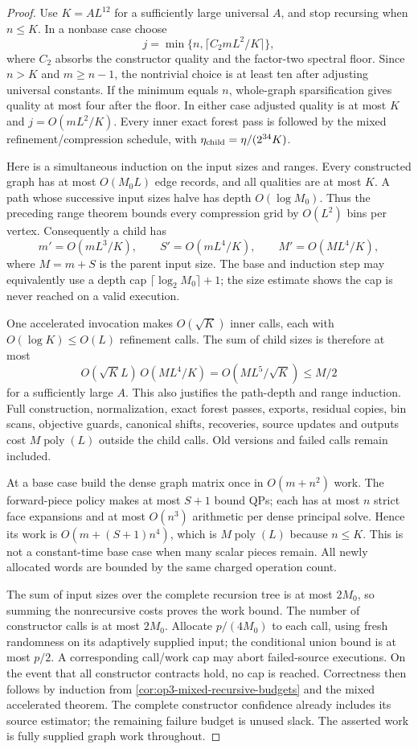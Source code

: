\begin{proof}
Use $K=A L^{12}$ for a sufficiently large universal $A$, and stop
recursing when $n\leq K$. In a nonbase case choose
\[
 j=\min\{n,\lceil C_2mL^2/K\rceil\},
\]
where $C_2$ absorbs the constructor quality and the factor-two spectral
floor. Since $n>K$ and $m\geq n-1$, the nontrivial choice is at least
ten after adjusting universal constants. If the minimum equals $n$,
whole-graph sparsification gives quality at most four after the floor.
In either case adjusted quality is at most $K$ and
$j=O(mL^2/K)$. Every inner exact forest pass is followed by the
mixed refinement/compression schedule, with
$\eta_{\rm child}=\eta/(2^{34}K)$.

Here is a simultaneous induction on the input sizes and ranges.
Every constructed graph has at most $O(M_0L)$ edge records, and
all qualities are at most $K$. A path whose successive input sizes
halve has depth $O(\log M_0)$. Thus the preceding range theorem bounds
every compression grid by $O(L^2)$ bins per vertex. Consequently a child
has
\[
 m' = O(mL^3/K),\qquad S'=O(mL^4/K),\qquad
 M'=O(ML^4/K),
\]
where $M=m+S$ is the parent input size. The base and induction step
may equivalently use a depth cap $\lceil\log_2 M_0\rceil+1$;
the size estimate shows the cap is never reached on a valid execution.

One accelerated invocation makes $O(\sqrt K)$ inner calls, each with
$O(\log K)\leq O(L)$ refinement calls. The sum of child sizes is
therefore at most
\[
 O(\sqrt K L)\,O(ML^4/K)
 =O(ML^5/\sqrt K)\leq M/2
\]
for a sufficiently large $A$. This also justifies the path-depth and
range induction. Full construction, normalization, exact forest passes,
exports, residual copies, bin scans, objective guards, canonical shifts,
recoveries, source updates and outputs cost $M\operatorname{poly}(L)$
outside the child calls. Old versions and failed calls remain included.

At a base case build the dense graph matrix once in $O(m+n^2)$ work.
The forward-piece policy makes at most $S+1$ bound QPs; each has at most
$n$ strict face expansions and at most $O(n^3)$ arithmetic per dense
principal solve. Hence its work is $O(m+(S+1)n^4)$, which is
$M\operatorname{poly}(L)$ because $n\leq K$. This is not a
constant-time base case when many scalar pieces remain. All newly
allocated words are bounded by the same charged operation count.

The sum of input sizes over the complete recursion tree is at most
$2M_0$, so summing the nonrecursive costs proves the work bound.
The number of constructor calls is at most $2M_0$. Allocate
$p/(4M_0)$ to each call, using fresh randomness on its adaptively supplied
input; the conditional union bound is at most $p/2$. A corresponding
call/work cap may abort failed-source executions. On the event that all
constructor contracts hold, no cap is reached. Correctness then follows
by induction from \cref{cor:op3-mixed-recursive-budgets} and the mixed
accelerated theorem. The complete constructor confidence already includes
its source estimator; the remaining failure budget is unused slack.
The asserted work is fully supplied
graph work throughout.
\end{proof}


